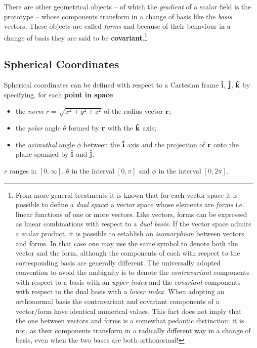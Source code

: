 There are other geometrical objects -- of which the \textit{gradient} of a scalar field is the prototype -- whose components transform in a change of basis like the \textit{basis} vectors. These objects are called \textit{forms} and because of their behaviour in a change of basis they are said to be \textbf{covariant}.\footnote{From more general treatments it is known that for each vector space it is possible to define a \textit{dual space}: a vector space whose elements are \textit{forms} i.e. linear functions of one or more vectors. Like vectors, forms can be expressed as linear combinations with respect to a \textit{dual basis}. If the vector space admits a scalar product, it is possible to establish an \textit{isomorphism} between vectors and forms. In that case one may use the same symbol to denote both the vector and the form, although the components of each with respect to the corresponding basis are generally different. The universally adopted convention to avoid the ambiguity is to denote the \textit{contravariant} components with respect to a basis with an \textit{upper index} and the \textit{covariant} components with respect to the dual basis with a \textit{lower index}. 
When adopting an orthonormal basis the contravariant and covariant components of a vector/form have identical numerical values. This fact does not imply that the one between vectors and forms is a somewhat pedantic distinction: it is not, as their components transform in a radically different way in a change of basis, even when the two bases are both orthonormal!}

\subsection{Spherical Coordinates}
Spherical coordinates can be defined with respect to a Cartesian frame $\vu{i}$, $\vu{j}$, $\vu{k}$ by specifying, for each \textbf{point in space}
\begin{itemize}
\item the \textit{norm} $r = \sqrt{x^2 + y^2 + z^2}$ of the radius vector $\vb{r}$; 
\item the \textit{polar} angle $\theta$ formed by $\vb{r}$ with the $\vu{k}$ axis;
\item the \textit{azimuthal} angle $\phi$ between the $\vu{i}$ axis and the projection of $\vb{r}$ onto the plane spanned by $\vu{i}$ and $\vu{j}$.
\end{itemize}
$r$ ranges in $[0, \infty]$, $\theta$ in the interval $[0, \pi]$ and $\phi$ in the interval $[0, 2\pi]$.

